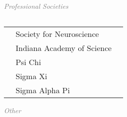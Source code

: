 \documentclass[11pt]{cooperCV_v1/cooperCV} %
\begin{document}
\begin{minipage}{\textwidth}







  
    
       \textcolor{gray}{{\emph{Professional \newline Societies}}} 
       \begin{tabular}{ p{} %
                        p{} 
                        p{}} %
      
      \end{tabular}
    
       \textcolor{gray}{{\emph{}}} 
       \begin{tabular}{ p{} %
                        p{} 
                        p{}} %
       
      \small &  Society for Neuroscience & {\hfill}\\ 
       
      \small &  Indiana Academy of Science & {\hfill}\\ 
       
      \small &  Psi Chi & {\hfill}\\ 
       
      \small &  Sigma Xi & {\hfill}\\ 
       
      \small &  Sigma Alpha Pi & {\hfill}\\ 
      
      \end{tabular}
    
  

  
    
       \textcolor{gray}{{\emph{Other \newline}}} 
       \begin{tabular}{ p{} %
                        p{} 
                        p{}} %
      

\end{tabular}
\end{minipage}
\end{document}

